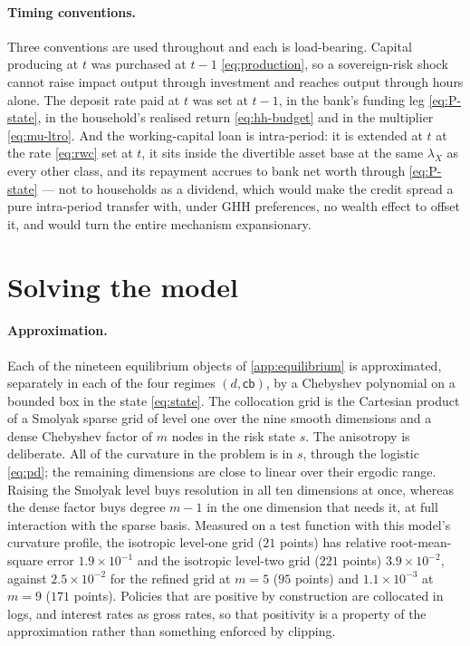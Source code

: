 \paragraph{Timing conventions.} Three conventions are used throughout and each is
load-bearing. Capital producing at $t$ was purchased at $t-1$
\eqref{eq:production}, so a sovereign-risk shock cannot raise impact output
through investment and reaches output through hours alone. The deposit rate paid
at $t$ was set at $t-1$, in the bank's funding leg \eqref{eq:P-state}, in the
household's realised return \eqref{eq:hh-budget} and in the multiplier
\eqref{eq:mu-ltro}. And the working-capital loan is intra-period: it is extended
at $t$ at the rate \eqref{eq:rwc} set at $t$, it sits inside the divertible asset
base at the same $\lambda_X$ as every other class, and its repayment accrues to
bank net worth through \eqref{eq:P-state} --- not to households as a dividend,
which would make the credit spread a pure intra-period transfer with, under GHH
preferences, no wealth effect to offset it, and would turn the entire mechanism
expansionary.


\section{Solving the model}
\label{app:solution}

\paragraph{Approximation.} Each of the nineteen equilibrium objects of
\cref{app:equilibrium} is approximated, separately in each of the four regimes
$(d,\mathsf{cb})$, by a Chebyshev polynomial on a bounded box in the state
\eqref{eq:state}. The collocation grid is the Cartesian product of a Smolyak
sparse grid \citep{smolyak1963,kruegerkubler2004,judd2014smolyak} of level one
over the nine smooth dimensions and a dense Chebyshev factor of $m$ nodes in the
risk state $s$. The anisotropy is deliberate. All of the curvature in the problem
is in $s$, through the logistic \eqref{eq:pd}; the remaining dimensions are close
to linear over their ergodic range. Raising the Smolyak level buys resolution in
all ten dimensions at once, whereas the dense factor buys degree $m-1$ in the one
dimension that needs it, at full interaction with the sparse basis. Measured on a
test function with this model's curvature profile, the isotropic level-one grid
($21$ points) has relative root-mean-square error $1.9\times10^{-1}$ and the
isotropic level-two grid ($221$ points) $3.9\times10^{-2}$, against
$2.5\times10^{-2}$ for the refined grid at $m=5$ ($95$ points) and
$1.1\times10^{-3}$ at $m=9$ ($171$ points). Policies that are positive by
construction are collocated in logs, and interest rates as gross rates, so that
positivity is a property of the approximation rather than something enforced by
clipping.

